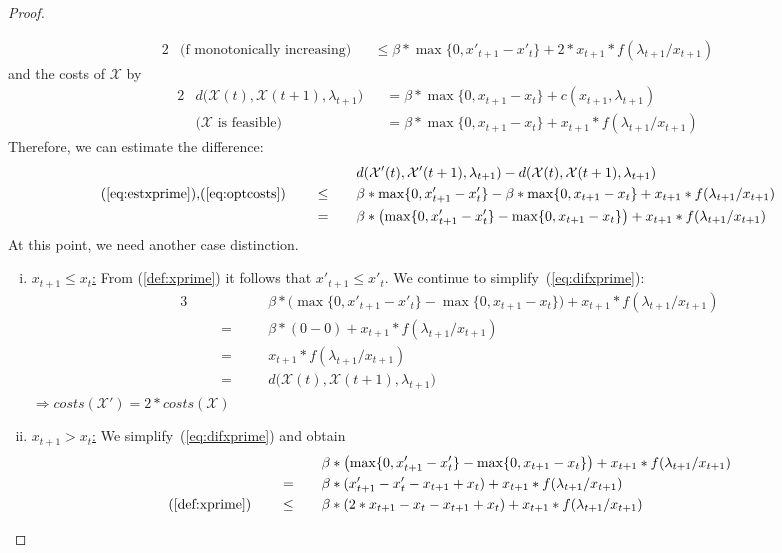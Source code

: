 \documentclass[hidelinks]{article}
\theoremstyle{plain}
\theoremstyle{definition}
\theoremstyle{rem}
\newcommand{\mx}{\mathcal{X}}
\begin{document}
\begin{sloppypar}
\begin{proof}
\begin{enumerate}
\begin{enumerate}
\begin{alignat}{2}
			&\text{(f monotonically increasing)} &&\le\beta*\max\{0,x'_{t+1}-x'_t\}+2*x_{t+1}*f(\lambda_{t+1}/x_{t+1})\label{eq:estxprime}
		\end{alignat}
		and the costs of $\mx$ by
		\begin{alignat}{2}
			&d\bigl(\mx(t),\mx(t+1),\lambda_{t+1}\bigr)&&=\beta*\max\{0,x_{t+1}-x_t\}+c(x_{t+1},\lambda_{t+1})\nonumber\\
			&\text{($\mx$ is feasible)}&&=\beta*\max\{0,x_{t+1}-x_t\}+x_{t+1}*f(\lambda_{t+1}/x_{t+1})\label{eq:optcosts}
		\end{alignat}
		Therefore, we can estimate the difference:
		\begin{alignat}{3}
			&&&&&d(\mx'(t),\mx'(t+1),\lambda_{t+1})-d(\mx(t),\mx(t+1),\lambda_{t+1})\nonumber\\
			&\text{(\ref{eq:estxprime}),(\ref{eq:optcosts})}\quad&&\le\quad&&\beta*\max\{0,x'_{t+1}-x'_t\}-\beta*\max\{0,x_{t+1}-x_t\}+x_{t+1}*f(\lambda_{t+1}/x_{t+1})\nonumber\\
			&&&=&&\beta*\bigl(\max\{0,x'_{t+1}-x'_t\}-\max\{0,x_{t+1}-x_t\}\bigr)+x_{t+1}*f(\lambda_{t+1}/x_{t+1})\label{eq:difxprime}
		\end{alignat}
		At this point, we need another case distinction.
		\begin{enumerate}[(i)]
			\item \underline{$x_{t+1}\le x_{t}$:}
				From (\ref{def:xprime}) it follows that $x'_{t+1}\le x'_{t}$. We continue to simplify~(\ref{eq:difxprime}):
			\begin{alignat*}{3}
				&&&&&\beta*\bigl(\max\{0,x'_{t+1}-x'_t\}-\max\{0,x_{t+1}-x_t\}\bigr)+x_{t+1}*f(\lambda_{t+1}/x_{t+1})\\
				&&&=\quad&&\beta*(0-0)+x_{t+1}*f(\lambda_{t+1}/x_{t+1})\\
				&&&=&&x_{t+1}*f(\lambda_{t+1}/x_{t+1})\\
				&&&=&&d\bigl(\mx(t),\mx(t+1),\lambda_{t+1}\bigr)
			\end{alignat*}
			$\Rightarrow costs(\mx')=2*costs(\mx)$
			\item \underline{$x_{t+1} > x_{t}$:}
			We simplify~(\ref{eq:difxprime}) and obtain
			\begin{alignat*}{3}
				&&&&&\beta*\bigl(\max\{0,x'_{t+1}-x'_t\}-\max\{0,x_{t+1}-x_t\}\bigr)+x_{t+1}*f(\lambda_{t+1}/x_{t+1})\\
				&&&=\quad&&\beta*(x'_{t+1}-x'_t-x_{t+1}+x_t)+x_{t+1}*f(\lambda_{t+1}/x_{t+1})\\
				&\text{(\ref{def:xprime})}\quad&&\le&&\beta*(2*x_{t+1}-x_t-x_{t+1}+x_t)+x_{t+1}*f(\lambda_{t+1}/x_{t+1})\\

\end{alignat*}
\end{enumerate}
\end{enumerate}
\end{enumerate}
\end{proof}
\end{sloppypar}
\end{document}
